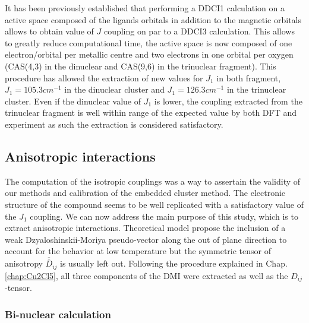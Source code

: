 \documentclass[12pt]{report}
\numberwithin{equation}{section}
\begin{document}
It has been previously established that performing a DDCI1 calculation on a active space composed of the ligands orbitals in addition to the magnetic orbitals allows to obtain value of $J$ coupling on par to a DDCI3 calculation.
This allows to greatly reduce computational time, the active space is now composed of one electron/orbital per metallic centre and two electrons in one orbital per oxygen (CAS(4,3) in the dinuclear and CAS(9,6) in the trinuclear fragment).
This procedure has allowed the extraction of new values for $J_1$ in both fragment, $J_1=105.3 cm^{-1}$ in the dinuclear cluster and $J_1=126.3 cm^{-1}$ in the trinuclear cluster.
Even if the dinuclear value of $J_1$ is lower, the coupling extracted from the trinuclear fragment is well within range of the expected value by both DFT and experiment as such the extraction is considered satisfactory.




\subsection{Anisotropic interactions}

The computation of the isotropic couplings was a way to assertain the validity of our methods and calibration of the embedded cluster method.
The electronic structure of the compound seems to be well replicated with a satisfactory value of the $J_1$ coupling.
We can now address the main purpose of this study, which is to extract anisotropic interactions.
Theoretical model propose the inclusion of a weak Dzyaloshinskii-Moriya pseudo-vector along the out of plane direction to account for the behavior at low temperature but the symmetric tensor of anisotropy $\overline{\overline{D}}_{ij}$ is usually left out.
Following the procedure explained in Chap.\ref{chap:Cu2Cl5}, all three components of the DMI were extracted as well as the $D_{ij}$-tensor.


\subsubsection*{Bi-nuclear calculation}
\end{document}
